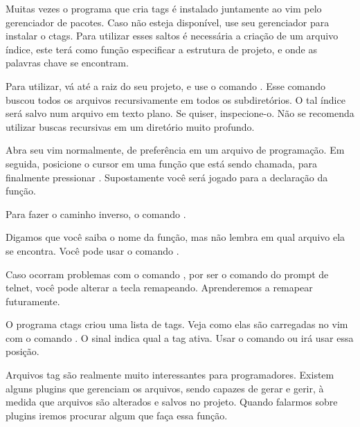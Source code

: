 Muitas vezes o programa que cria tags é instalado juntamente ao vim pelo gerenciador de pacotes.
Caso não esteja disponível, use seu gerenciador para instalar o ctags.
Para utilizar esses saltos é necessária a criação de um  arquivo índice,
este terá como função especificar a estrutura de projeto,
e onde as palavras chave se encontram.

Para utilizar, vá até a raiz do seu projeto, e use o comando .
Esse comando buscou todos os arquivos recursivamente em todos os subdiretórios.
O tal índice será salvo num arquivo em texto plano. Se quiser, inspecione-o.
Não se recomenda utilizar buscas recursivas em um diretório muito profundo.

Abra seu vim normalmente, de preferência em um arquivo de programação.
Em seguida, posicione o cursor em uma função que está sendo chamada,
para finalmente pressionar \vimcommand{CTRL ]}.
Supostamente você será jogado para a declaração da função.

Para fazer o caminho inverso, o comando .

Digamos que você saiba o nome da função, mas não lembra em qual arquivo ela se encontra.
Você pode usar o comando .

Caso ocorram problemas com o comando \vimcommand{CTRL ]},
por ser o comando  do prompt de telnet,
você pode alterar a tecla remapeando.
Aprenderemos a remapear futuramente.

O programa ctags criou uma lista de tags.
Veja como elas são carregadas no vim com o comando .
O sinal \vimkeys{$>$} indica qual a tag ativa.
Usar o comando  ou  irá usar essa posição.

Arquivos tag são realmente muito interessantes para programadores.
Existem alguns plugins que gerenciam os arquivos, sendo capazes de gerar e gerir,
à medida que arquivos são alterados e salvos no projeto.
Quando falarmos sobre plugins iremos procurar algum que faça essa função.

\newpage
